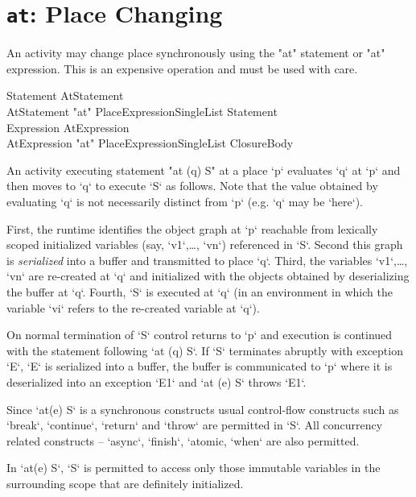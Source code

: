 \section{ {\tt at}: Place Changing}\label{AtStatement}

An activity may change place synchronously using the \xcd"at" statement or
\xcd"at" expression. This is an expensive operation and must be used
with care.

\begin{grammar}
Statement \: AtStatement \\
AtStatement \: \xcd"at" PlaceExpressionSingleList Statement \\
Expression \: AtExpression \\
AtExpression \: \xcd"at" PlaceExpressionSingleList ClosureBody 
\end{grammar}

An activity executing statement \xcd"at (q) S" at a place \xcd`p`
evaluates \xcd`q` at \xcd`p` and then moves to \xcd`q` to execute
\xcd`S` as follows. Note that the value obtained by evaluating \xcd`q`
is not necessarily distinct from \xcd`p` (e.g.{} \xcd`q` may be
\xcd`here`).

First, the runtime identifies the object graph at \xcd`p` reachable
from lexically scoped initialized variables (say, \xcd`v1`,\ldots,
\xcd`vn`) referenced in \xcd`S`.  Second this graph is {\em
  serialized} into a buffer and transmitted to place \xcd`q`.  Third,
the variables \xcd`v1`,\ldots, \xcd`vn` are re-created at \xcd`q` and
initialized with the objects obtained by deserializing the buffer at
\xcd`q`. Fourth, \xcd`S` is executed at \xcd`q` (in an environment in
which the variable \xcd`vi` refers to the re-created variable at
\xcd`q`).

On normal termination of \xcd`S` control returns to \xcd`p` and
execution is continued with the statement following \xcd`at (q) S`. If
\xcd`S` terminates abruptly with exception \xcd`E`, \xcd`E` is
serialized into a buffer, the buffer is communicated to \xcd`p` where
it is deserialized into an exception \xcd`E1` and \xcd`at (e) S`
throws \xcd`E1`.

Since \xcd`at(e) S` is a synchronous constructs usual control-flow
constructs such as \xcd`break`, \xcd`continue`, \xcd`return` and 
\xcd`throw` are permitted in \xcd`S`.  All concurrency related
constructs -- \xcd`async`, \xcd`finish`, \xcd`atomic, \xcd`when` are
also permitted.

\Limitation{} In \xcd`at(e) S`, \xcd`S` is permitted to access only
those immutable variables in the surrounding scope that are definitely
initialized.

